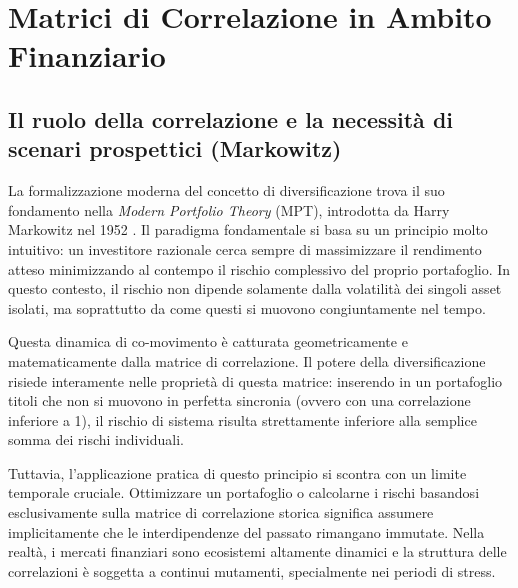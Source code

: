 \chapter{Matrici di Correlazione in Ambito Finanziario}
\label{ch:matrici_finanziarie}

\section{Il ruolo della correlazione e la necessità di scenari prospettici (Markowitz)}
\label{sec:markowitz}

La formalizzazione moderna del concetto di diversificazione trova il suo fondamento nella \emph{Modern Portfolio Theory} (MPT), introdotta da Harry Markowitz nel 1952 \citep{markowitz1952portfolio}. Il paradigma fondamentale si basa su un principio molto intuitivo: un investitore razionale cerca sempre di massimizzare il rendimento atteso minimizzando al contempo il rischio complessivo del proprio portafoglio. In questo contesto, il rischio non dipende solamente dalla volatilità dei singoli asset isolati, ma soprattutto da come questi si muovono congiuntamente nel tempo. 

Questa dinamica di co-movimento è catturata geometricamente e matematicamente dalla matrice di correlazione. Il potere della diversificazione risiede interamente nelle proprietà di questa matrice: inserendo in un portafoglio titoli che non si muovono in perfetta sincronia (ovvero con una correlazione inferiore a 1), il rischio di sistema risulta strettamente inferiore alla semplice somma dei rischi individuali.

Tuttavia, l'applicazione pratica di questo principio si scontra con un limite temporale cruciale. Ottimizzare un portafoglio o calcolarne i rischi basandosi esclusivamente sulla matrice di correlazione storica significa assumere implicitamente che le interdipendenze del passato rimangano immutate. Nella realtà, i mercati finanziari sono ecosistemi altamente dinamici e la struttura delle correlazioni è soggetta a continui mutamenti, specialmente nei periodi di stress.

